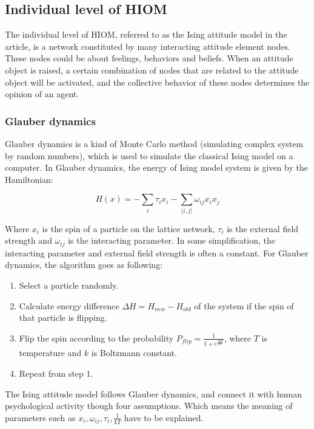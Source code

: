 \documentclass{article}
\begin{document}
\subsection{Individual level of HIOM}
The individual level of HIOM, referred to as the Ising attitude model in the article, is a network constituted by many interacting attitude element nodes. These 
nodes could be about feelings, behaviors and beliefs. When an attitude object is raised, a certain combination of nodes that are related to the attitude object
will be activated, and the collective behavior of these nodes determines the opinion of an agent.

\subsubsection{Glauber dynamics}
Glauber dynamics is a kind of Monte Carlo method (simulating complex system by random numbers), which is used to simulate the classical Ising model on a computer. In Glauber dynamics, the energy
of Ising model system is given by the Hamiltonian\cite{cipra1987introduction,brush1967history}:

\begin{equation}
    H(x) = -\sum_i \tau_i x_i -\sum_{\langle i,j \rangle} \omega_{ij}x_ix_j
\end{equation}

Where $x_i$ is the spin of a particle on the lattice network, $\tau_i$ is the external field strength and $\omega_{ij}$ is the interacting parameter. In some simplification, the
interacting parameter and external field strength is often a constant. For Glauber dynamics, the algorithm
goes as following\cite{walter2015introduction}:
\begin{enumerate}
    \item Select a particle randomly.
    \item Calculate energy difference $\Delta H = H_{new} - H_{old}$ of the system if the spin of that particle is flipping.
    \item Flip the spin according to the probability $P_{flip} = \frac{1}{1+e^{\frac{\Delta H}{kT}}}$, where $T$ is temperature and $k$ is Boltzmann constant.
    \item Repeat from step 1.
\end{enumerate}
The Ising attitude model follows Glauber dynamics, and connect it with human psychological activity though four assumptions. Which means the meaning of parameters
such as $x_i, \omega_{ij}, \tau_i, \frac{1}{kT}$ have to be explained.
\end{document}
